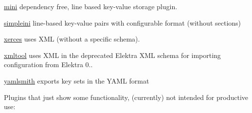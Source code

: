 \begin{DoxyItemize}
\item \hyperlink{autotoc_md404_src_plugins_mini_README_md}{mini} dependency free, line based key-\/value storage plugin.
\item \hyperlink{autotoc_md639_src_plugins_simpleini_README_md}{simpleini} line-\/based key-\/value pairs with configurable format (without sections)
\item \hyperlink{autotoc_md825_src_plugins_xerces_README_md}{xerces} uses X\+ML (without a specific schema).
\item \hyperlink{autotoc_md831_src_plugins_xmltool_README_md}{xmltool} uses X\+ML in the deprecated Elektra X\+ML schema for importing configuration from Elektra 0..
\item \hyperlink{autotoc_md947_src_plugins_yamlsmith_README_md}{yamlsmith} exports key sets in the Y\+A\+ML format
\end{DoxyItemize}

Plugins that just show some functionality, (currently) not intended for productive use\+:


